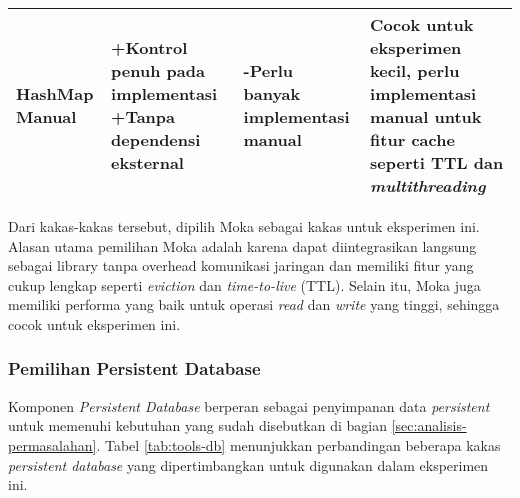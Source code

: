 \begin{table}[h]
{\begin{tabular}{|l|p{5cm}|p{5cm}|p{3cm}|}
            HashMap Manual & +Kontrol penuh pada implementasi \newline +Tanpa dependensi eksternal & -Perlu banyak implementasi manual & Cocok untuk eksperimen kecil, perlu implementasi manual untuk fitur cache seperti TTL dan \textit{multithreading}\\ \hline
        \end{tabular}
    }
    \label{tab:tools-kv}
\end{table}

Dari kakas-kakas tersebut, dipilih Moka sebagai kakas untuk eksperimen ini. Alasan utama pemilihan Moka adalah karena dapat diintegrasikan langsung sebagai library tanpa overhead komunikasi jaringan dan memiliki fitur yang cukup lengkap seperti \textit{eviction} dan \textit{time-to-live} (TTL). Selain itu, Moka juga memiliki performa yang baik untuk operasi \textit{read} dan \textit{write} yang tinggi, sehingga cocok untuk eksperimen ini.

\subsubsection{Pemilihan Persistent Database}
\label{subsubsection:persistent-database}

Komponen \textit{Persistent Database} berperan sebagai penyimpanan data \textit{persistent} untuk memenuhi kebutuhan yang sudah disebutkan di bagian \ref{sec:analisis-permasalahan}. Tabel \ref{tab:tools-db} menunjukkan perbandingan beberapa kakas \textit{persistent database} yang dipertimbangkan untuk digunakan dalam eksperimen ini.

